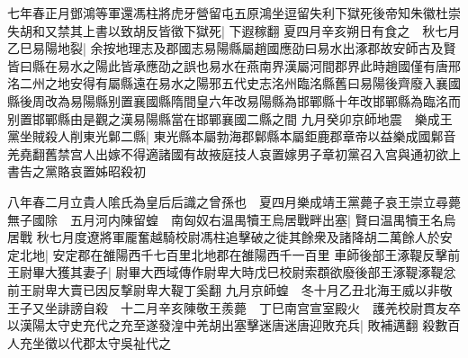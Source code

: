 七年春正月鄧鴻等軍還馮柱將虎牙營留屯五原鴻坐逗留失利下獄死後帝知朱徽杜崇失胡和又禁其上書以致胡反皆徵下獄死|{
	下遐稼翻}
夏四月辛亥朔日有食之　秋七月乙巳易陽地裂|{
	余按地理志及郡國志易陽縣屬趙國應劭曰易水出涿郡故安師古及賢皆曰縣在易水之陽此皆承應劭之誤也易水在燕南界漢屬河間郡界此時趙國僅有唐邢洺二州之地安得有屬縣遠在易水之陽邪五代史志洺州臨洺縣舊曰易陽後齊廢入襄國縣後周改為易陽縣别置襄國縣隋間皇六年改易陽縣為邯鄲縣十年改邯鄲縣為臨洺而别置邯鄲縣由是觀之漢易陽縣當在邯鄲襄國二縣之間}
九月癸卯京師地震　樂成王黨坐賊殺人削東光鄡二縣|{
	東光縣本屬勃海郡鄡縣本屬鉅鹿郡章帝以益樂成國鄡音羌堯翻舊禁宫人出嫁不得適諸國有故掖庭技人哀置嫁男子章初黨召入宫與通初欲上書告之黨賂哀置姊昭殺初}


八年春二月立貴人隂氏為皇后后識之曾孫也　夏四月樂成靖王黨薨子哀王崇立尋薨無子國除　五月河内陳留蝗　南匈奴右温禺犢王烏居戰畔出塞|{
	賢曰温禺犢王名烏居戰}
秋七月度遼將軍龎奮越騎校尉馮柱追擊破之徙其餘衆及諸降胡二萬餘人於安定北地|{
	安定郡在雒陽西千七百里北地郡在雒陽西千一百里}
車師後部王涿鞮反擊前王尉畢大獲其妻子|{
	尉畢大西域傳作尉卑大時戊巳校尉索頵欲廢後部王涿鞮涿鞮忿前王尉卑大賣已因反撃尉卑大鞮丁奚翻}
九月京師蝗　冬十月乙丑北海王威以非敬王子又坐誹謗自殺　十二月辛亥陳敬王羨薨　丁巳南宫宣室殿火　護羌校尉貫友卒以漢陽太守史充代之充至遂發湟中羌胡出塞擊迷唐迷唐迎敗充兵|{
	敗補邁翻}
殺數百人充坐徵以代郡太守吳祉代之


